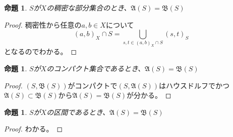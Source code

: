 \documentclass[leqno]{jsarticle}
\newtheorem{prop}[thm]{命題}
\begin{document}
\begin{prop}
$S$が$X$の稠密な部分集合のとき、$\mathfrak{A}(S)=\mathfrak{B}(S)$
\end{prop}
\begin{proof}
稠密性から任意の$a,b\in X$について
\[
(a,b)_X\cap S=\bigcup_{s,t\in (a,b)_X\cap S}(s,t)_S
\]
となるのでわかる。
\end{proof}

\begin{prop}
$S$が$X$のコンパクト集合であるとき、$\mathfrak{A}(S)=\mathfrak{B}(S)$
\end{prop}
\begin{proof}
$(S,\mathfrak{B}(S))$がコンパクトで$(S,\mathfrak{A}(S))$はハウスドルフでかつ$\mathfrak{A}(S)\subset \mathfrak{B}(S)$から$\mathfrak{A}(S)=\mathfrak{B}(S)$が分かる。
\end{proof}

\begin{prop}
$S$が$X$の区間であるとき、$\mathfrak{A}(S)=\mathfrak{B}(S)$
\end{prop}
\begin{proof}
わかる。
\end{proof}



















			
\end{document}

